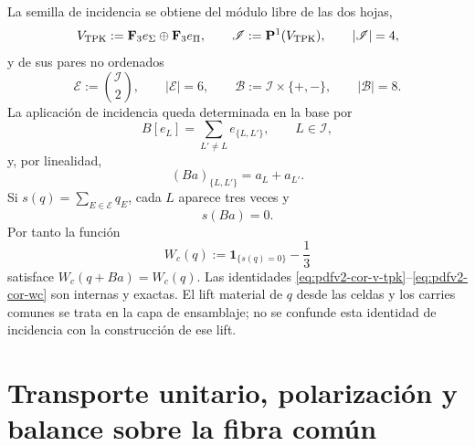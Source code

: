 La semilla de incidencia se obtiene del módulo libre de las dos hojas,
\begin{equation}
\label{eq:pdfv2-cor-v-tpk}
 V_{\rm TPK}:=\mathbf F_3e_\Sigma\oplus\mathbf F_3e_\Pi,
 \qquad
 \mathscr I:=\mathbf P^1(V_{\rm TPK}),
 \qquad |\mathscr I|=4,
\end{equation}
y de sus pares no ordenados
\begin{equation}
\label{eq:pdfv2-cor-incidencias}
 \mathscr E:=\binom{\mathscr I}{2},
 \qquad |\mathscr E|=6,
 \qquad
 \mathscr B:=\mathscr I\times\{+,-\},
 \qquad |\mathscr B|=8.
\end{equation}
La aplicación de incidencia queda determinada en la base por
\begin{equation}
\label{eq:pdfv2-cor-b-incidencia-generadores}
 B[e_L]=\sum_{L'\neq L}e_{\{L,L'\}},
 \qquad L\in\mathscr I,
\end{equation}
y, por linealidad,
\begin{equation}
\label{eq:pdfv2-cor-b-incidencia-coordenadas}
 (Ba)_{\{L,L'\}}=a_L+a_{L'}.
\end{equation}
Si \(s(q)=\sum_{E\in\mathscr E}q_E\), cada \(L\) aparece tres veces y
\begin{equation}
\label{eq:pdfv2-cor-sb-cero}
 s(Ba)=0.
\end{equation}
Por tanto la función
\begin{equation}
\label{eq:pdfv2-cor-wc}
 W_c(q):=\mathbf1_{\{s(q)=0\}}-\frac13
\end{equation}
satisface \(W_c(q+Ba)=W_c(q)\). Las identidades
\eqref{eq:pdfv2-cor-v-tpk}--\eqref{eq:pdfv2-cor-wc} son internas y exactas.
El lift material de \(q\) desde las celdas y los carries comunes se trata en
la capa de ensamblaje; no se confunde esta identidad de incidencia con la
construcción de ese lift.

\section{Transporte unitario, polarización y balance sobre la fibra común}

